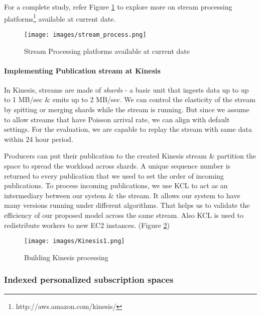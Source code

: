 \documentclass[a4paper,12pt,oneside]{book}
\theoremstyle{definition}
\theoremstyle{remark}
\begin{document}
For a complete study, refer Figure \ref{img:stream_process_platform} to explore more on stream processing platforms\footnote{http://aws.amazon.com/kinesis/} available at current date.

\begin{figure}[h]
\begin{center}
\texttt{[image: images/stream\_process.png]}
\caption{Stream Processing platforms available at current date}
\label{img:stream_process_platform}
\end{center}
\end{figure}

\paragraph*{Implementing Publication stream at Kinesis} In Kinesis, streams are made of \emph{shards} - a basic unit that ingests data up to up to 1 MB/sec \& emits up to 2 MB/sec. We can control the elasticity of the stream by spitting or merging shards while the stream is running. But since we assume to allow streams that have Poisson arrival rate, we can align with default settings. For the evaluation, we are capable to replay the stream with same data within 24 hour period.

Producers can put their publication to the created Kinesis stream \& partition the space to spread the workload across shards. A unique sequence number is returned to every publication that we used to set the order of incoming publications. To process incoming publications, we use \ac{KCL} to act as an intermediary between our system \& the stream. It allows our system to have many versions running under different algorithms. That helps us to validate the efficiency of our proposed model across the same stream. Also \ac{KCL} is used to redistribute workers to new \ac{EC2} instances. (Figure \ref{img:kinesis_process})

\begin{figure}[h]
\begin{center}
\texttt{[image: images/Kinesis1.png]}
\caption{Building Kinesis processing}
\label{img:kinesis_process}
\end{center}
\end{figure}



\subsubsection{Indexed personalized subscription spaces}
\end{document}
